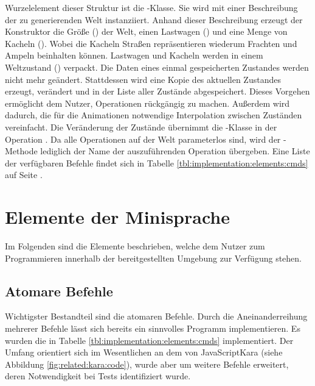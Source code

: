 Wurzelelement dieser Struktur ist die -Klasse. Sie wird mit einer Beschreibung der zu generierenden Welt instanziiert. Anhand dieser Beschreibung erzeugt der Konstruktor die Größe () der Welt, einen Lastwagen () und eine Menge von Kacheln (). Wobei die Kacheln Straßen repräsentieren wiederum Frachten und Ampeln beinhalten können. Lastwagen und Kacheln werden in einem Weltzustand () verpackt. Die Daten eines einmal gespeicherten Zustandes werden nicht mehr geändert. Stattdessen wird eine Kopie des aktuellen Zustandes erzeugt, verändert und in der Liste aller Zustände abgespeichert. Dieses Vorgehen ermöglicht dem Nutzer, Operationen rückgängig zu machen. Außerdem wird dadurch, die für die Animationen  notwendige Interpolation zwischen Zuständen vereinfacht. Die Veränderung der Zustände übernimmt die -Klasse in der Operation . Da alle Operationen auf der Welt parameterlos sind, wird der -Methode lediglich der Name der auszuführenden Operation übergeben. Eine Liste der verfügbaren Befehle findet sich in Tabelle \ref{tbl:implementation:elements:cmds} auf Seite \pageref{tbl:implementation:elements:cmds}.

\section{Elemente der Minisprache}
\label{sec:implementation:elements}

Im Folgenden sind die Elemente beschrieben, welche dem Nutzer zum Programmieren innerhalb der bereitgestellten Umgebung zur Verfügung stehen.

\subsection*{Atomare Befehle}
\label{sec:implementation:elements:cmds}

Wichtigster Bestandteil sind die atomaren Befehle. Durch die Aneinanderreihung mehrerer Befehle lässt sich bereits ein sinnvolles Programm implementieren. Es wurden die in Tabelle \ref{tbl:implementation:elements:cmds} implementiert. Der Umfang orientiert sich im Wesentlichen an dem von JavaScriptKara (siehe Abbildung \ref{fig:related:kara:code}), wurde aber um weitere Befehle erweitert, deren Notwendigkeit bei Tests identifiziert wurde.

